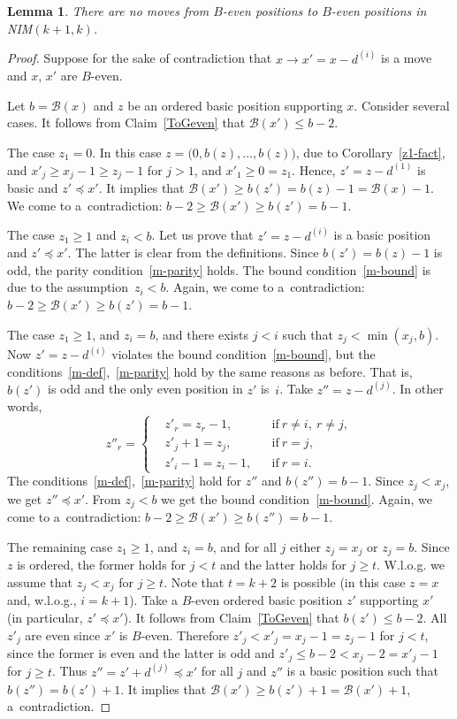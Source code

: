 \documentclass{article}
\newtheorem{lemma}{Lemma}
\theoremstyle{definition}
\def\mv#1{d^{(#1)}}
\def\B{\mathcal{B}}
\begin{document}
\begin{lemma}\label{GevenGeven}
  There are no moves from  $B$-even positions to  $B$-even positions in \textup{NIM}$(k+1,k)$.
\end{lemma}
\begin{proof}
  Suppose for the sake of contradiction that $x\to x' = x-\mv{i}$ is a move and $x$, $x'$ are $B$-even.

  Let $b = \B(x)$ and $z$ be an ordered basic position supporting $x$. Consider several cases. It follows from  Claim~\ref{ToGeven} that $\B(x')\leq b-2$.

  The case $z_1=0$. In this case  $z= \big(0,b(z),\dots, b(z)\big)$, due to Corollary~\ref{z1-fact}, and $x'_j\geq x_j-1\geq z_j-1$ for $j>1$, and $x'_1\geq 0=z_1$.
 Hence, $z'=z-\mv{1}$ is basic and $z' \preceq x'$. It implies that $\B(x')\geq b(z') = b(z)-1= \B(x)-1$.  We come to a~contradiction:  $b-2\geq \B(x')\geq b(z')= b-1$.

   The case $z_1\geq1$ and $z_i< b$. Let us prove that $z' = z-\mv{i}$ is a basic position and $z'\preceq x'$. The latter is clear from the definitions. Since $b(z')=b(z)-1$ is odd, the parity condition~\eqref{m-parity} holds. The bound condition~\eqref{m-bound} is due to the assumption~$z_i< b$. Again, we come  to a~contradiction:  $b-2\geq \B(x')\geq b(z')= b-1$.

   The case $z_1\geq1$, and $z_i= b$, and there exists $j< i$ such that $z_j<\min(x_j,b)$. Now $z' = z-\mv{i}$ violates the bound condition~\eqref{m-bound}, but the conditions~\eqref{m-def},~\eqref{m-parity} hold by the same reasons as before. That is, $b(z')$ is odd and the only even position in $z'$ is~$i$. Take $z'' = z-\mv{j}$. In other words, 
\[
z''_r = \left\{
\begin{aligned}
  &z'_r = z_r-1, &&\text{if}\ r\ne i, \ r\ne j,\\
  &z'_j+1 = z_j, &&\text{if}\ r=j,\\
  &z'_i-1 =z_i-1, &&\text{if}\ r=i.
\end{aligned}\right.
\]
The conditions~\eqref{m-def},~\eqref{m-parity} hold for $z''$  and $b(z'')=b-1$. Since $z_j<x_j$, we get $z''\preceq x'$. From $z_j<b$ we get the bound condition~\eqref{m-bound}. Again, we come  to a~contradiction:  $b-2\geq \B(x')\geq b(z'')= b-1$.

The remaining case $z_1\geq1$, and $z_i= b$, and for all $j$ either $z_j=x_j$ or  $z_j=b$. Since $z$ is ordered, the former holds for $j<t$ and the latter holds for $j\geq t$. W.l.o.g. we assume that $z_j<x_j$ for $j\geq t$. Note that $t=k+2$ is possible (in this case $z = x$ and, w.l.o.g., $i=k+1$). Take a $B$-even ordered basic position $z'$ supporting $x'$ (in particular, $z'\preceq x'$). It follows from Claim~\ref{ToGeven} that $b(z')\leq b-2$. All $z'_j$ are even since $x'$ is $B$-even. Therefore $z'_j< x'_j = x_j-1 = z_j-1$ for $j<t$, since the former is even and the latter is odd and $z'_j \leq b-2 < x_j-2 = x'_j-1$ for $j\geq t$. Thus $z''=z'+\mv{j}\preceq x'$ for all $j$ and $z''$ is a basic position such that $b(z'') = b(z')+1 $. It implies that $\B(x')\geq b(z')+1 = \B(x')+1$, a~contradiction.
\end{proof}
\end{document}
